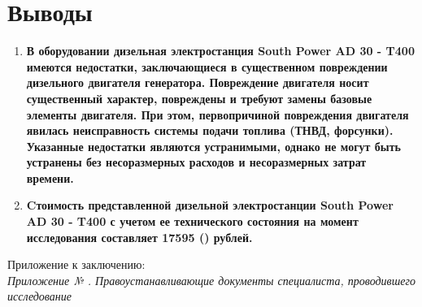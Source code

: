 \section{Выводы}

\begin{enumerate}
	\item \textbf{В оборудовании  дизельная электростанция South Power AD 30 - T400 имеются недостатки, заключающиеся в существенном повреждении дизельного двигателя генератора. Повреждение двигателя носит существенный характер, повреждены и требуют замены базовые элементы двигателя. При этом, первопричиной повреждения двигателя явилась неисправность системы подачи топлива (ТНВД, форсунки).  Указанные недостатки являются устранимыми, однако не могут быть устранены без несоразмерных расходов и несоразмерных затрат времени.}\\[3mm]
	
	\item \textbf{Cтоимость представленной дизельной электростанции South Power AD 30 - T400 с учетом ее технического состояния на момент исследования составляет 17595 () рублей.}
	
	\vspace{5mm}
	
\end{enumerate}

\vspace{10mm}
\relax
{}
\vspace{15mm}

\vspace{15mm}

\relax
\noindent Приложение к заключению:\\
\textit{
	Приложение № \Rownum. Правоустанавливающие документы специалиста, проводившего исследование\\
}

